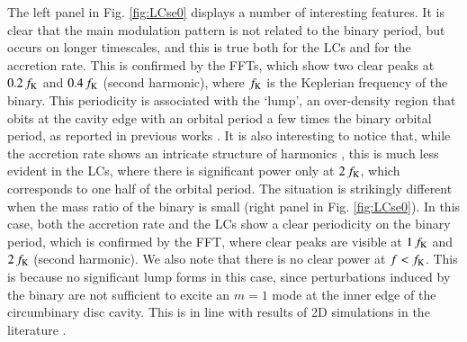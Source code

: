 \documentclass{aa}
\begin{document}
The left panel in Fig. \ref{fig:LCse0} displays a number of interesting features. It is  clear that the main modulation pattern is not related to the binary period, but occurs on longer timescales, and this is true both for the LCs and for the accretion rate. This is confirmed by the FFTs, which show two clear peaks at $0.2\,f_{\rm K}$ and $0.4\,f_{\rm K}$ (second harmonic), where $f_{\rm K}$ is the Keplerian frequency of the binary. This periodicity is associated with the ‘lump’, an over-density region that obits at the cavity edge with an orbital period a few times the binary orbital period, as reported in previous works \citep{Macfadyen2008, Cuadra2009, Krolik2010, roedig2011, Noble2012, Shi2012, dorazio2013, farris2014, Bowen2018, Tang2018, Westernacher2022, Westernacher2023}. It is also interesting to notice that, while the accretion rate shows an intricate structure of harmonics \citep{farris2014,Munoz2019,Franchini2023}, this is much less evident in the LCs, where there is significant power only at $2\,f_{\rm K}$, which corresponds to one half of the orbital period. 
The situation is strikingly different when the mass ratio of the binary is small (right panel in Fig. \ref{fig:LCse0}). In this case, both the accretion rate and the LCs show a clear periodicity on the binary period, which is confirmed by the FFT, where clear peaks are visible at $1\,f_{\rm K}$ and $2\,f_{\rm K}$ (second harmonic). We also note that there is no clear power at $f<f_{\rm K}$. This is because no significant lump forms in this case, since perturbations induced by the binary are not sufficient to excite an $m=1$ mode at the inner edge of the circumbinary disc cavity. This is in line with results of 2D simulations in the literature \citep[see e.g.][]{farris2014}.
\end{document}
